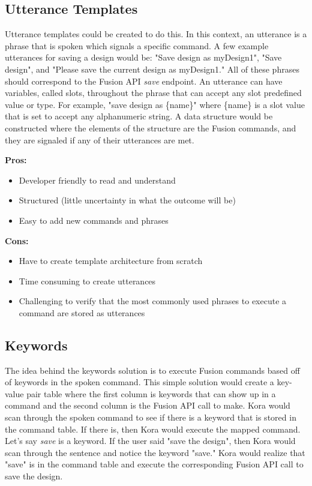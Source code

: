 \documentclass[onecolumn, draftclsnofoot,10pt, compsoc]{IEEEtran}
\begin{document}
			
			\subsection{Utterance Templates}
				Utterance templates could be created to do this.
				In this context, an utterance is a phrase that is spoken which signals a specific command.
				A few example utterances for saving a design would be: "Save design as myDesign1", "Save design", and "Please save the current design as myDesign1."
				All of these phrases should correspond to the Fusion API \textit{save} endpoint.
				An utterance can have variables, called slots, throughout the phrase that can accept any slot predefined value or type.
				For example, "save design as \{name\}" where \{name\} is a slot value that is set to accept any alphanumeric string.
				A data structure would be constructed where the elements of the structure are the Fusion commands, and they are signaled if any of their utterances are met.
			
				\textbf{Pros:}
					\begin{itemize}
						\item{
						Developer friendly to read and understand}
					\item{
						Structured (little uncertainty in what the outcome will be)}
					\item{
						Easy to add new commands and phrases}
					\end{itemize}
				
				\textbf{Cons:}
					\begin{itemize}
						\item{
							Have to create template architecture from scratch}
						\item{
							Time consuming to create utterances}
						\item{
							Challenging to verify that the most commonly used phrases to execute a command are stored as utterances}
					\end{itemize}
				
				
				
				\subsection{Keywords}
					The idea behind the keywords solution is to execute Fusion commands based off of keywords in the spoken command. 
					This simple solution would create a key-value pair table where the first column is keywords that can show up in a command and the second column is the Fusion API call to make.
					Kora would scan through the spoken command to see if there is a keyword that is stored in the command table.
					If there is, then Kora would execute the mapped command.
					Let's say \textit{save} is a keyword. 
					If the user said "save the design", then Kora would scan through the sentence and notice the keyword "save."
					Kora would realize that "save" is in the command table and execute the corresponding Fusion API call to save the design.
				
\end{document}
